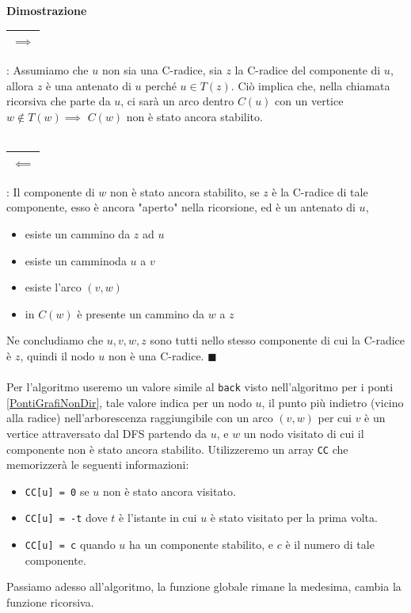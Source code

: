 \documentclass[12pt, letterpaper]{article}
\newcommand{\code}[1]{\colorbox{light-gray}{\texttt{#1}}}
\newcommand{\acc}{\\\hphantom{}\\}
\newcommand{\boxedMath}[1]{\begin{tabular}{|c|}\hline \texttt{#1} \\ \hline\end{tabular} :}
\begin{document}
\textbf{Dimostrazione} \boxedMath{$\implies$} Assumiamo che $u$ non sia una C-radice, sia $z$ la C-radice del componente
di $u$, allora $z$ è una antenato di $u$ perché $u\in T(z)$. Ciò implica che, nella chiamata ricorsiva che parte da $u$,
ci sarà un arco dentro $C(u)$ con un vertice $w\notin T(w)\implies$ $ C(w)$ non è stato ancora stabilito.
\acc\boxedMath{$\impliedby$} Il componente di $w$ non è stato ancora stabilito, se $z$ è la C-radice di tale componente, esso
è ancora "aperto" nella ricorsione, ed è un antenato di $u$, \begin{itemize}
    \item esiste un cammino da $z$ ad $u$
    \item esiste un camminoda $u$ a $v$
    \item esiste l'arco $(v,w)$
    \item in $C(w)$ è presente un cammino da $w$ a $z$
\end{itemize}
Ne concludiamo che $u,v,w,z$ sono tutti nello stesso componente di cui la C-radice è $z$, quindi il nodo $u$
non è una C-radice. $\blacksquare$\acc
Per l'algoritmo useremo un valore simile al \code{back} visto nell'algoritmo per i ponti \ref{PontiGrafiNonDir}, tale
valore indica per un nodo $u$, il punto più indietro (vicino alla radice) nell'arborescenza raggiungibile con un
arco $(v,w)$ per cui $v$ è un vertice attraversato dal DFS partendo da $u$, e $w$ un nodo visitato di cui
il componente non è stato ancora stabilito. Utilizzeremo un array \code{CC} che memorizzerà le seguenti informazioni:\begin{itemize}
    \item \code{CC[u] = 0} se $u$ non è stato ancora visitato.
    \item \code{CC[u] = -t} dove $t$ è l'istante in cui $u$ è stato visitato per la prima volta.
    \item \code{CC[u] = c} quando $u$ ha un componente stabilito, e $c$ è il numero di tale componente.
\end{itemize}
Passiamo adesso all'algoritmo, la funzione globale rimane la medesima, cambia la funzione ricorsiva.
\end{document}
